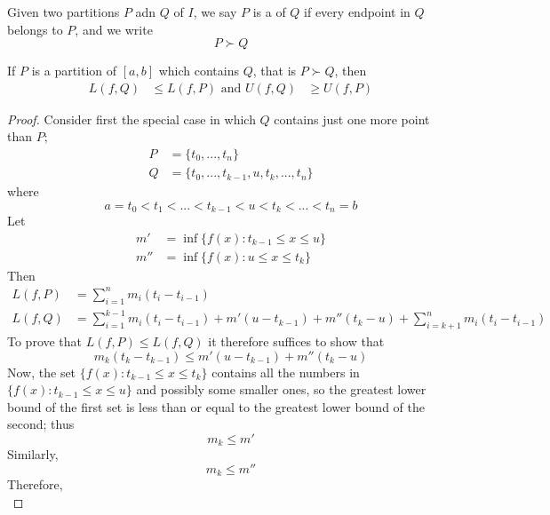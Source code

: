 \begin{defn}
    Given two partitions $P$ adn $Q$ of $I$, we say $P$ is a  of $Q$ if every endpoint in $Q$ belongs to $P$, and we write $$P \succ Q$$
\end{defn}

\begin{lem}
    If $P$ is a partition of $[a,b]$ which contains $Q$, that is $P \succ Q$, then \begin{align*}
        L(f,Q) &\leq L(f,P) \text{ and } U(f,Q) &\geq U(f,P)
    \end{align*}
\end{lem}
\begin{proof}
    Consider first the special case in which $Q$ contains just one more point than $P$;\begin{align*}
        P &=\{t_0,...,t_n\} \\
        Q &= \{t_0,...,t_{k-1},u,t_k,...,t_n\}
    \end{align*}
    where $$a= t_0 < t_1 < ... < t_{k-1} < u < t_k < ... < t_n = b$$
    Let \begin{align*}
        m' &= \inf\{f(x):t_{k-1}\leq x \leq u\} \\
        m'' &= \inf\{f(x):u \leq x \leq t_k\}
    \end{align*}
    Then \begin{align*}
        L(f,P) &= \sum\limits_{i=1}^nm_i(t_i - t_{i-1}) \\
        L(f,Q) &= \sum\limits_{i=1}^{k-1}m_i(t_i - t_{i-1}) + m'(u-t_{k-1}) + m''(t_k-u) + \sum\limits_{i=k+1}^nm_i(t_i - t_{i-1})
    \end{align*}
    To prove that $L(f,P) \leq L(f,Q)$ it therefore suffices to show that \begin{equation*}
        m_k(t_k-t_{k-1}) \leq m'(u-t_{k-1}) + m''(t_k-u)
    \end{equation*}
    Now, the set $\{f(x):t_{k-1}\leq x \leq t_k\}$ contains all the numbers in $\{f(x):t_{k-1}\leq x \leq u\}$ and possibly some smaller        ones, so the greatest lower bound of the first set is less than or equal to the greatest lower bound of the second; thus                    \begin{equation*}
        m_k \leq m'
    \end{equation*}
    Similarly, \begin{equation*}
        m_k \leq m''
    \end{equation*}
    Therefore, \begin{equation*}

\end{equation*}
\end{proof}
